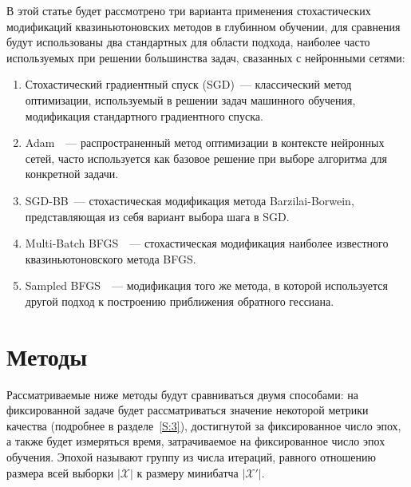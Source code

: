\documentclass[preprint,12pt]{elsarticle}
\begin{document}
В этой статье будет рассмотрено три варианта применения стохастических модификаций квазиньютоновских методов в глубинном обучении, для сравнения будут использованы два стандартных для области подхода, наиболее часто используемых при решении большинства задач, свазанных с нейронными сетями:
\begin{enumerate}
    \item Стохастический градиентный спуск (SGD)~--- классический метод оптимизации, используемый в решении задач машинного обучения, модификация стандартного градиентного спуска.
    \item Adam~\cite{adam}~--- распространенный метод оптимизации в контексте нейронных сетей, часто используется как базовое решение при выборе алгоритма для конкретной задачи. 
    \item SGD-BB~\cite{BB-DL}--- стохастическая модификация метода Barzilai-Borwein, представляющая из себя вариант выбора шага в SGD.
    \item Multi-Batch BFGS~\cite{multibatchLBFGS}~--- стохастическая модификация наиболее известного квазиньютоновского метода BFGS.
    \item Sampled BFGS~\cite{sampledbfgs}~--- модификация того же метода, в которой используется другой подход к  построению приближения обратного гессиана.
\end{enumerate}
\section{Методы}
\label{S:2}
Рассматриваемые ниже методы будут сравниваться двумя способами: на фиксированной задаче будет рассматриваться значение некоторой метрики качества (подробнее в разделе~\ref{S:3}), достигнутой за фиксированное число эпох, а также будет измеряться время, затрачиваемое на фиксированное число эпох обучения. 
Эпохой называют группу из числа итераций, равного отношению размера всей выборки $|\mathcal{X}|$ к размеру минибатча $|\mathcal{X}'|$.
\end{document}
